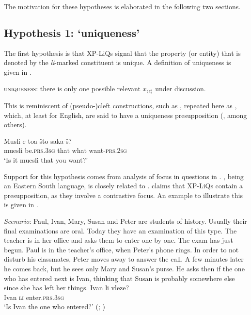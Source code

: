 \documentclass[output=paper,
colorlinks,
citecolor=brown,
newtxmath
]{langscibook}
\begin{document}
\noindent
The motivation for these hypotheses is elaborated in the following two sections.


\subsection{Hypothesis 1: `uniqueness'}\label{sec:uniqueness}

The first hypothesis is that XP-LiQs signal that the property (or entity) that is denoted by the \textit{li}-marked constituent is unique. A definition of uniqueness is given in .


\ea \textsc{uniqueness}: there is only one possible relevant $x_{\langle e \rangle}$ under discussion. \label{uniqueness}
\z

\noindent
This is reminiscent of (pseudo-)cleft constructions, such as , repeated here as , which, at least for English, are said to have a uniqueness presupposition (\citealt{drenhaus2011}, among others).


\ea \gll Musli e toa što saka-š? \\
muesli be.\textsc{prs.3sg} that what want-\textsc{prs.2sg} \\
\glt `Is it muesli that you want?'
\label{cleft2}
\z

\noindent
Support for this hypothesis comes from  analysis of focus in questions in . , being an Eastern South  language, is closely related to . \citet{dukova2010} claims that XP-LiQs contain a presupposition, as they involve a contrastive focus. An example to illustrate this is given in .


\eanoraggedright
\eanoraggedright \textit{Scenario}: Paul, Ivan, Mary, Susan and Peter are students of history. Usually their final
examinations are oral. Today they have an examination of this type. The teacher is in her
office and asks them to enter one by one. The exam has just begun. Paul is in the teacher's
office, when Peter's phone rings. In order to not disturb his classmates, Peter moves away to
answer the call. A few minutes later he comes back, but he sees only Mary and Susan's purse.
He asks then if the one who has entered next is Ivan, thinking that Susan is probably
somewhere else since she has left her things.
\ex \gll Ivan li vleze? \\
Ivan \textsc{li} enter.\textsc{prs.3sg} \\
\glt `Is Ivan the one who entered?' \hfill (;  \citealt[258]{dukova2010})
\label{ivan}
\z\z
\end{document}
